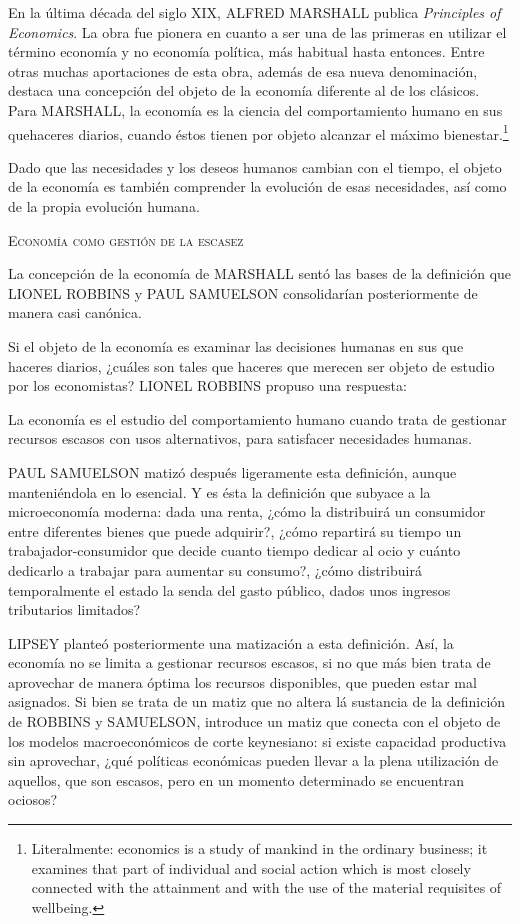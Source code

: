 \documentclass[10pt,a4paper]{article}
\begin{document}
En la última década del siglo XIX, ALFRED MARSHALL publica \textit{Principles of Economics}. La obra fue pionera en cuanto a ser una de las primeras en utilizar el término economía y no economía política, más habitual hasta entonces. Entre otras muchas aportaciones de esta obra, además de esa nueva denominación, destaca una concepción del objeto de la economía diferente al de los clásicos. Para MARSHALL, la economía es la ciencia del comportamiento humano en sus quehaceres diarios, cuando éstos tienen por objeto alcanzar el máximo bienestar.\footnote{%
    Literalmente: economics is a study of mankind in the ordinary business; it examines that part of individual and social action which is most closely connected with the attainment and with the use of the material requisites of wellbeing.
}

Dado que las necesidades y los deseos humanos cambian con el tiempo, el objeto de la economía es también comprender la evolución de esas necesidades, así como de la propia evolución humana. 

\textsc{Economía como gestión de la escasez} 

La concepción de la economía de MARSHALL sentó las bases de la definición que LIONEL ROBBINS y PAUL SAMUELSON consolidarían posteriormente de manera casi canónica. 

Si el objeto de la economía es examinar las decisiones humanas en sus que haceres diarios, ¿cuáles son tales que haceres que merecen ser objeto de estudio por los economistas? LIONEL ROBBINS propuso una respuesta: 

La economía es el estudio del comportamiento humano cuando trata de gestionar recursos escasos con usos alternativos, para satisfacer necesidades humanas. 

PAUL SAMUELSON matizó después ligeramente esta definición, aunque manteniéndola en lo esencial. Y es ésta la definición que subyace a la microeconomía moderna: dada una renta, ¿cómo la distribuirá un consumidor entre diferentes bienes que puede adquirir?, ¿cómo repartirá su tiempo un trabajador-consumidor que decide cuanto tiempo dedicar al ocio y cuánto dedicarlo a trabajar para aumentar su consumo?, ¿cómo distribuirá temporalmente el estado la senda del gasto público, dados unos ingresos tributarios limitados? 

LIPSEY planteó posteriormente una matización a esta definición. Así, la economía no se limita a gestionar recursos escasos, si no que más bien trata de aprovechar de manera óptima los recursos disponibles, que pueden estar mal asignados. Si bien se trata de un matiz que no altera lá sustancia de la definición de ROBBINS y SAMUELSON, introduce un matiz que conecta con el objeto de los modelos macroeconómicos de corte keynesiano: si existe capacidad productiva sin aprovechar, ¿qué políticas económicas pueden llevar a la plena utilización de aquellos, que son escasos, pero en un momento determinado se encuentran ociosos?
\end{document}
